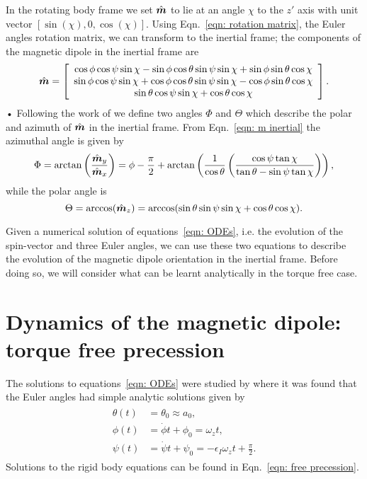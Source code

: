 \documentclass[../full_thesis/full_thesis.tex]{subfiles}
\begin{document}
In the rotating body frame we set $\hat{\boldsymbol{m}}$ to lie at an angle $\chi$ to the $z'$ axis with
unit vector $[\sin(\chi), 0, \cos(\chi)]$. Using Eqn.~\eqref{eqn: rotation matrix},
the Euler angles rotation matrix, we can transform to the inertial frame; the
components of the magnetic dipole in the inertial frame are
\begin{equation}
\hat{\boldsymbol{m}} =
\left[\begin{array}{c}
\cos\phi\cos\psi\sin\chi - \sin\phi \cos \theta \sin \psi \sin \chi
+ \sin \phi \sin \theta \cos \chi \\
\sin\phi\cos\psi\sin\chi + \cos\phi \cos \theta \sin \psi \sin \chi
- \cos \phi \sin \theta \cos \chi \\
\sin\theta \cos\psi \sin\chi + \cos\theta \cos \chi
\end{array}\right].
\label{eqn: m inertial}
\end{equation}•
Following the work of \citet{Jones2001} we define two angles $\Phi$ and $\Theta$
which describe the polar and azimuth of $\hat{\boldsymbol{m}}$ in the inertial frame.
From Eqn.~\eqref{eqn: m inertial} the azimuthal angle is given by
\begin{equation}
    \Phi = \arctan\left(\frac{\hat{\boldsymbol{m}}_{y}}{\hat{\boldsymbol{m}}_{x}}\right) =
\phi - \frac{\pi}{2} + \arctan\left(\frac{1}{\cos\theta}
                       \left(\frac{\cos\psi \tan \chi}{\tan\theta -
                       \sin \psi \tan\chi }\right)\right),
\label{eqn: Phi}
\end{equation}
while the polar angle is
\begin{equation}
\Theta = \arccos(\hat{\boldsymbol{m}}_{z}) = \arccos(\sin \theta \sin \psi \sin \chi + \cos \theta \cos \chi ).
\label{eqn: Theta 2}
\end{equation}

Given a numerical solution of equations~\eqref{eqn: ODEs}, i.e. the evolution
of the spin-vector and three Euler angles, we can use these two equations to
describe the evolution of the magnetic dipole orientation in the inertial
frame. Before doing so, we will consider what can be learnt analytically in the
torque free case.

\section{Dynamics of the magnetic dipole: torque free precession}
\label{sec: understanding the motion of m}

The solutions to equations~\eqref{eqn: ODEs} were studied by \citet{Jones2001}
where it was found that the Euler angles had simple analytic solutions given by
\begin{align}
\begin{split}
    \theta(t) & = \theta_{0} \approx a_{0}, \\
    \phi(t) & = \dot{\phi}t + \phi_{0} = \omega_{z} t, \\
    \psi(t) & = \dot{\psi}t + \psi_{0}= -\epsilon_{I}\omega_{z}t+\frac{\pi}{2}.
\end{split}
\label{eqn: euler angles torque free evolution}
\end{align}
Solutions to the rigid body equations can be found in Eqn.~\eqref{eqn:
free precession}.
\end{document}
